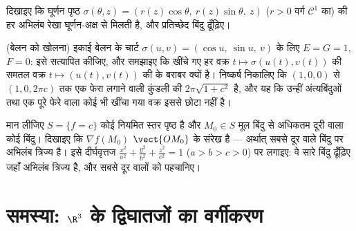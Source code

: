 \begin{exercise}[$\star\star$]\label{exo:b2:surfaces:10}
दिखाइए कि घूर्णन पृष्ठ
$\sigma(\theta, z) = (r(z)\cos\theta,\ r(z)\sin\theta,\ z)$
($r > 0$ वर्ग $\mathcal C^1$ का) की हर अभिलंब रेखा घूर्णन-अक्ष से मिलती है, और
प्रतिच्छेद बिंदु ढूँढ़िए।
\end{exercise}

\begin{exercise}[$\star\star$]\label{exo:b2:surfaces:11}
(बेलन को खोलना) इकाई बेलन के चार्ट $\sigma(u, v) = (\cos u,\
\sin u,\ v)$ के लिए $E = G = 1$, $F = 0$: इसे
सत्यापित कीजिए, और समझाइए कि खींचे गए हर वक्र $t \mapsto
\sigma(u(t), v(t))$ की  समतल
वक्र $t
\mapsto (u(t), v(t))$ की  के बराबर क्यों है। निष्कर्ष निकालिए कि $(1, 0, 0)$ से
$(1, 0, 2\pi c)$ तक एक फेरा लगाने वाली कुंडली की \omterm{def:b2:curves:length}{लंबाई} $2\pi\sqrt{1 + c^2}$ है, और यह कि उन्हीं
अंत्यबिंदुओं तथा एक पूरे फेरे वाला कोई भी खींचा गया वक्र इससे छोटा
नहीं है।
\end{exercise}

\begin{exercise}[$\star\star\star$]\label{exo:b2:surfaces:12}
मान लीजिए $S = \{f = c\}$ कोई  नियमित स्तर पृष्ठ है और $M_0 \in S$ मूल बिंदु से
अधिकतम दूरी वाला कोई बिंदु। दिखाइए कि $\nabla f(M_0)$ $\vect{OM_0}$ के संरेख है ---
अर्थात् सबसे दूर वाले बिंदु पर अभिलंब त्रिज्य है। इसे दीर्घवृत्तज
$\frac{x^2}{a^2} + \frac{y^2}{b^2} + \frac{z^2}{c^2} = 1$ ($a >
b > c > 0$) पर लगाइए: वे सारे बिंदु ढूँढ़िए जहाँ अभिलंब त्रिज्य
है, और सबसे दूर वालों को पहचानिए।
\end{exercise}

\section{समस्या: $\R^3$ के द्विघातजों का
वर्गीकरण}

